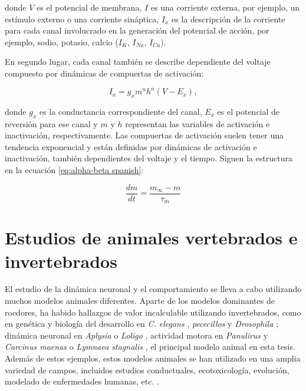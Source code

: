 donde \( V \) es el potencial de membrana, \( I \) es una corriente externa, por ejemplo, un estímulo externo o una corriente sináptica, \( I_{x} \) es la descripción de la corriente para cada canal involucrado en la generación del potencial de acción, por ejemplo, sodio, potasio, calcio (\( I_K \), \( I_{Na} \), \( I_{Ca} \)).

En segundo lugar, cada canal también se describe dependiente del voltaje compuesto por dinámicas de compuertas de activación:

\begin{equation}
I_x =  g_x m^n h^n (V - E_x),
\end{equation}

donde \( g_x \) es la conductancia correspondiente del canal, \( E_x \) es el potencial de reversión para ese canal y \( m \) y \( h \) representan las variables de activación e inactivación, respectivamente.
Las compuertas de activación suelen tener una tendencia exponencial y están definidas por dinámicas de activación e inactivación, también dependientes del voltaje y el tiempo. Siguen la estructura en la ecuación \ref{eq:alpha-beta spanish}:

\begin{equation}
\frac{dm}{dt} = \frac{m_{\infty} - m}{\tau_m}
\label{eq:alpha-beta spanish}
\end{equation}

\section{Estudios de animales vertebrados e invertebrados}
\label{c-intro-invertebrates spanish}
El estudio de la dinámica neuronal y el comportamiento se lleva a cabo utilizando muchos modelos animales diferentes. Aparte de los modelos dominantes de roedores, ha habido hallazgos de valor incalculable utilizando invertebrados, como en genética y biología del desarrollo en \textit{C. elegans} \parencite{brenner_genetics_1974}, \textit{pececillos} \parencite{streisinger_production_1981} y \textit{Drosophila} \parencite{nusslein-volhard_mutations_1980}; dinámica neuronal en \textit{Aplysia} \parencite{wachtel_direct_1967} o \textit{Loligo} \parencite{HODGKIN1952}, actividad motora en \textit{Panulirus} \parencite{SELVERSTON1976} y \textit{Carcinus maenas} \parencite{eisen_mechanisms_1982} o \textit{Lymnaea stagnalis} \parencite{Benjamin1979b}, el principal modelo animal en esta tesis. Además de estos ejemplos, estos modelos animales se han utilizado en una amplia variedad de campos, incluidos estudios conductuales, ecotoxicología, evolución, modelado de enfermedades humanas, etc. \parencite{romanova_animal_2018}.

